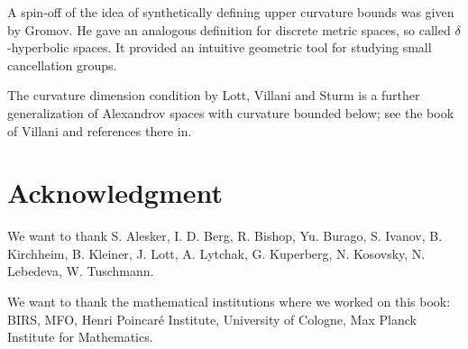 A spin-off of the idea of synthetically defining upper curvature bounds 
was given by Gromov. 
He gave an analogous definition for discrete metric spaces, so called $\delta$-hyperbolic spaces. 
It provided an intuitive geometric tool for studying small cancellation groups.

The curvature dimension condition by Lott, Villani and Sturm is a further generalization of Alexandrov spaces with curvature bounded below; see the book of Villani \cite{villani} and references there
in.

\section*{Acknowledgment}
We want to thank 
S. Alesker,
I. D. Berg,
R. Bishop, 
Yu. Burago, 
S. Ivanov,
B. Kirchheim, 
B. Kleiner, 
J. Lott,
A. Lytchak, 
G. Kuperberg, 
N. Kosovsky, 
N. Lebedeva, 
W. Tuschmann.


We want to thank the mathematical institutions where we worked on this book:
BIRS, 
MFO, 
Henri Poincar\'{e} Institute,
University of Cologne, 
Max Planck Institute for Mathematics.



